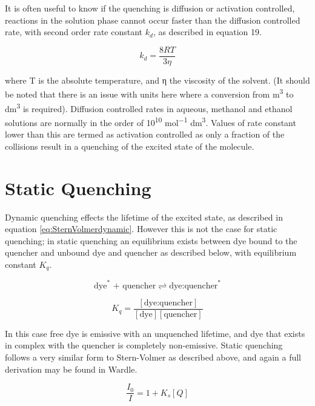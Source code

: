 \documentclass[
]{book}
\begin{document}
It is often useful to know if the quenching is diffusion or activation controlled, reactions in the solution phase cannot occur faster than the diffusion controlled rate, with second order rate constant \(k_d\), as described in equation 19.

\begin{equation}
k_d = \frac{8RT}{3 \eta}
\label{eq:diffcontrol}
\end{equation}

where T is the absolute temperature, and η the viscosity of the solvent. (It should be noted that there is an issue with units here where a conversion from m\textsuperscript{3} to dm\textsuperscript{3} is required). Diffusion controlled rates in aqueous, methanol and ethanol solutions are normally in the order of 10\textsuperscript{10} mol\textsuperscript{−1} dm\textsuperscript{3}. Values of rate constant lower than this are termed as activation controlled as only a fraction of the collisions result in a quenching of the excited state of the molecule.

\hypertarget{sec:static}{%
\section{Static Quenching}\label{sec:static}}

Dynamic quenching effects the lifetime of the excited state, as described in equation \eqref{eq:SternVolmerdynamic}. However this is not the case for static quenching; in static quenching an equilibrium exists between dye bound to the quencher and unbound dye and quencher as described below, with equilibrium constant \(K_q\).

\begin{equation*}
\textrm{dye}^\ast \textrm{ + quencher} \rightleftharpoons \textrm{dye:quencher}^\ast
\end{equation*}

\begin{equation*}
K_q = \frac{[\textrm{dye:quencher}]}{[\textrm{dye}][\textrm{quencher}]} 
\end{equation*}

In this case free dye is emissive with an unquenched lifetime, and dye that exists in complex with the quencher is completely non-emissive. Static quenching follows a very similar form to Stern-Volmer as described above, and again a full derivation may be found in Wardle.

\begin{equation}
\frac{I_0}{I}=1 + K_s [Q]
\label{eq:SternVolmerstatic}
\end{equation}
\end{document}
